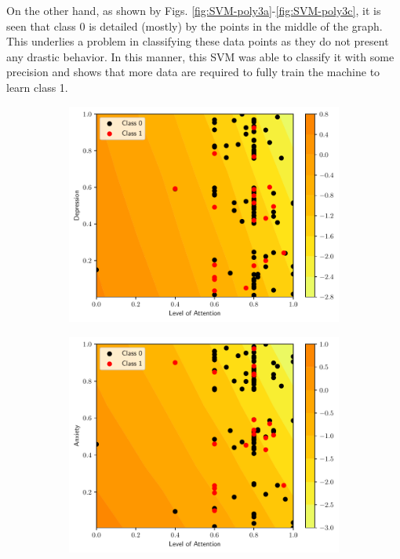 On the other hand, as shown by Figs. \ref{fig:SVM-poly3a}-\ref{fig:SVM-poly3c},
it is seen that class 0 is detailed (mostly) by the points in the middle of the
graph. This underlies a problem in classifying these data points as they do not
present any drastic behavior. In this manner, this SVM was able to classify it
with some precision and shows that more data are required to fully train the
machine to learn class 1.

\begin{figure}
  \centering
  \begin{subfigure}[b]{0.32\textwidth}
    \centering \includegraphics[width=\textwidth]{figs/svm-poly-contour-0-3.pdf}
    \caption{}
    \label{fig:SVM-poly1a}
  \end{subfigure}
  \begin{subfigure}[b]{0.32\textwidth}
    \centering \includegraphics[width=\textwidth]{figs/svm-poly-contour-0-4.pdf}

\end{subfigure}
\end{figure}
